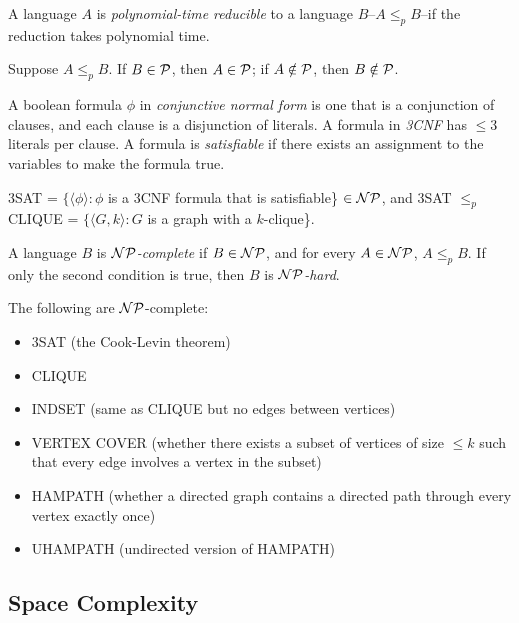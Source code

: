 \begin{definition}
A language $A$ is \emph{polynomial-time reducible} to a language $B$--$A \le_p B$--if the reduction takes polynomial time.
\end{definition}

\begin{theorem}
Suppose $A \le_p B$. If $B \in \mathcal{P}$, then $A \in \mathcal{P}$; if $A \notin \mathcal{P}$, then $B \notin \mathcal{P}$.
\end{theorem}

\begin{definition}
A boolean formula $\phi$ in \emph{conjunctive normal form} is one that is a conjunction of clauses, and each clause is a disjunction of literals. A formula in \emph{3CNF} has $\le 3$ literals per clause. A formula is \emph{satisfiable} if there exists an assignment to the variables to make the formula true.
\end{definition}

\begin{theorem}
3SAT = $\{\langle \phi \rangle : \phi$ is a 3CNF formula that is satisfiable\} $\in \mathcal{NP}$, and 3SAT $\le_p$ CLIQUE = $\{\langle G, k\rangle : G$ is a graph with a $k$-clique\}.
\end{theorem}

\begin{definition}
A language $B$ is \emph{$\mathcal{NP}$-complete} if $B \in \mathcal{NP}$, and for every $A \in \mathcal{NP}$, $A \le_p B$. If only the second condition is true, then $B$ is \emph{$\mathcal{NP}$-hard}.
\end{definition}

\begin{theorem}
The following are $\mathcal{NP}$-complete:
\begin{itemize}
\item 3SAT (the Cook-Levin theorem)
\item CLIQUE
\item INDSET (same as CLIQUE but no edges between vertices)
\item VERTEX COVER (whether there exists a subset of vertices of size $\le k$ such that every edge involves a vertex in the subset)
\item HAMPATH (whether a directed graph contains a directed path through every vertex exactly once)
\item UHAMPATH (undirected version of HAMPATH)
\end{itemize}
\end{theorem}

\subsection{Space Complexity}

